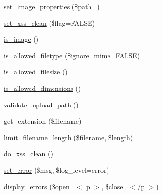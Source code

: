 \begin{DoxyCompactItemize}
\item 
\mbox{\hyperlink{class_c_i___upload_afe2c970e88b5387d2ec99d198ad78db9}{set\+\_\+image\+\_\+properties}} (\$path=\textquotesingle{}\textquotesingle{})
\item 
\mbox{\hyperlink{class_c_i___upload_aa0fdcdc09ee414866516aea622bfa4d8}{set\+\_\+xss\+\_\+clean}} (\$flag=F\+A\+L\+SE)
\item 
\mbox{\hyperlink{class_c_i___upload_a9f27ec4fec8956115c8b3d329cfe84ab}{is\+\_\+image}} ()
\item 
\mbox{\hyperlink{class_c_i___upload_adecf3ad0a635aaecb9fa4cb2c73dbe24}{is\+\_\+allowed\+\_\+filetype}} (\$ignore\+\_\+mime=F\+A\+L\+SE)
\item 
\mbox{\hyperlink{class_c_i___upload_af0538419d2efbf52b5a48dbeb423f909}{is\+\_\+allowed\+\_\+filesize}} ()
\item 
\mbox{\hyperlink{class_c_i___upload_acf477966777c54450112c9a010cb9e2b}{is\+\_\+allowed\+\_\+dimensions}} ()
\item 
\mbox{\hyperlink{class_c_i___upload_ab590b2fa695e3a6ea55c4cdfb6558673}{validate\+\_\+upload\+\_\+path}} ()
\item 
\mbox{\hyperlink{class_c_i___upload_a7f6d9ce01c82e6b31129cd7259de5f3c}{get\+\_\+extension}} (\$filename)
\item 
\mbox{\hyperlink{class_c_i___upload_a619b51989420bb9ec5744698a865178e}{limit\+\_\+filename\+\_\+length}} (\$filename, \$length)
\item 
\mbox{\hyperlink{class_c_i___upload_a7b7e8c47df50e999419a178ac56aa2dc}{do\+\_\+xss\+\_\+clean}} ()
\item 
\mbox{\hyperlink{class_c_i___upload_ab4b85f042b2d2d36c360a39dd8e97fe2}{set\+\_\+error}} (\$msg, \$log\+\_\+level=\textquotesingle{}error\textquotesingle{})
\item 
\mbox{\hyperlink{class_c_i___upload_a2e580ff38869c6494107c15541ab7e20}{display\+\_\+errors}} (\$open=\textquotesingle{}$<$ p $>$\textquotesingle{}, \$close=\textquotesingle{}$<$/p $>$\textquotesingle{})
\end{DoxyCompactItemize}

